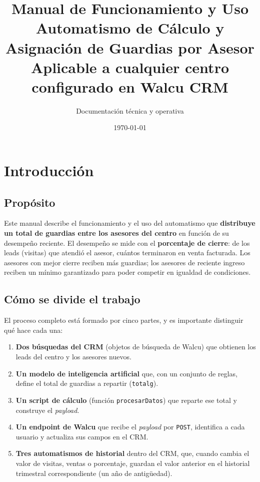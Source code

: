 \documentclass[11pt,a4paper]{article}
\title{\color{azul}\textbf{Manual de Funcionamiento y Uso}\\[0.4em]
\large Automatismo de Cálculo y Asignación de Guardias por Asesor\\[0.2em]
\normalsize Aplicable a cualquier centro configurado en Walcu CRM}
\author{Documentación técnica y operativa}
\date{\today}
\newcommand{\code}[1]{\texttt{#1}}
\begin{document}
\maketitle
\thispagestyle{fancy}

\tableofcontents
\newpage

\section{Introducción}

\subsection{Propósito}
Este manual describe el funcionamiento y el uso del automatismo que \textbf{distribuye un total de guardias entre los asesores del centro} en función de su desempeño reciente. El desempeño se mide con el \textbf{porcentaje de cierre}: de los leads (visitas) que atendió el asesor, cuántos terminaron en venta facturada. Los asesores con mejor cierre reciben más guardias; los asesores de reciente ingreso reciben un mínimo garantizado para poder competir en igualdad de condiciones.

\subsection{Cómo se divide el trabajo}
El proceso completo está formado por cinco partes, y es importante distinguir qué hace cada una:

\begin{enumerate}[nosep]
  \item \textbf{Dos búsquedas del CRM} (objetos de búsqueda de Walcu) que obtienen los leads del centro y los asesores nuevos.
  \item \textbf{Un modelo de inteligencia artificial} que, con un conjunto de reglas, define el total de guardias a repartir (\code{totalg}).
  \item \textbf{Un script de cálculo} (función \code{procesarDatos}) que reparte ese total y construye el \emph{payload}.
  \item \textbf{Un endpoint de Walcu} que recibe el \emph{payload} por \code{POST}, identifica a cada usuario y actualiza sus campos en el CRM.
  \item \textbf{Tres automatismos de historial} dentro del CRM, que, cuando cambia el valor de visitas, ventas o porcentaje, guardan el valor anterior en el historial trimestral correspondiente (un año de antigüedad).
\end{enumerate}
\end{document}
